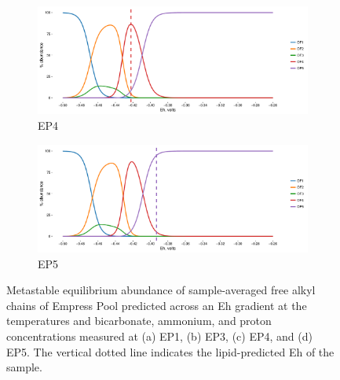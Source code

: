 \begin{figure}[h]\ContinuedFloat
\centering

    \begin{subfigure}[b]{\linewidth}
       	\includegraphics[width=1\linewidth]{"figs_app2/Empress OF4_thermo"}
       	\caption{EP4}
        \label{fig:EP4_thermo}
    \end{subfigure}
    \begin{subfigure}[b]{\linewidth}
    	\includegraphics[width=1\linewidth]{"figs_app2/Empress OF5_thermo"}
    	\caption{EP5}
        \label{fig:EP5_thermo}
    \end{subfigure}
    
    \caption[Metastable equilibrium abundance of sample-averaged free alkyl chains of Empress Pool]{Metastable equilibrium abundance of sample-averaged free alkyl chains of Empress Pool predicted across an Eh gradient at the temperatures and bicarbonate, ammonium, and proton concentrations measured at (a) EP1, (b) EP3, (c) EP4, and (d) EP5. The vertical dotted line indicates the lipid-predicted Eh of the sample.}
    \label{fig:EP_thermo}
\end{figure}

\newpage

